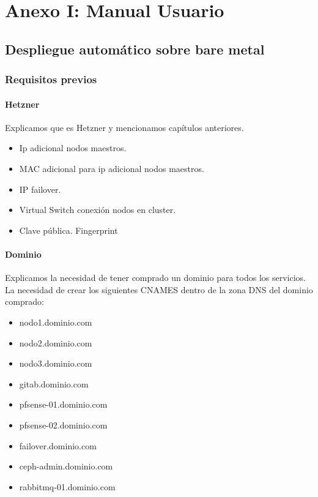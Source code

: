 \chapter {Anexo I: Manual Usuario}
	\section{Despliegue automático sobre bare metal}
		\subsection{Requisitos previos}
			\subsubsection{Hetzner}
				\begin{paragraph}
					Explicamos que es Hetzner y mencionamos capítulos anteriores.
						\begin{itemize}
							\item Ip adicional nodos maestros.
							\item MAC adicional para ip adicional nodos maestros.
							\item IP failover.
							\item Virtual Switch conexión nodos en cluster. 
							\item Clave pública. Fingerprint
						\end{itemize}	
				\end{paragraph}
			\subsubsection{Dominio}
				\begin{paragraph}
					Explicamos la necesidad de tener comprado un dominio para todos los servicios. La necesidad de crear los siguientes CNAMES dentro de la zona DNS del dominio comprado:
					\begin{itemize}
						\item nodo1.dominio.com
						\item nodo2.dominio.com 
						\item nodo3.dominio.com
						\item gitab.dominio.com
						\item pfsense-01.dominio.com
						\item pfsense-02.dominio.com
						\item failover.dominio.com
						\item ceph-admin.dominio.com
						\item rabbitmq-01.dominio.com
					\end{itemize}
				\end{paragraph}
